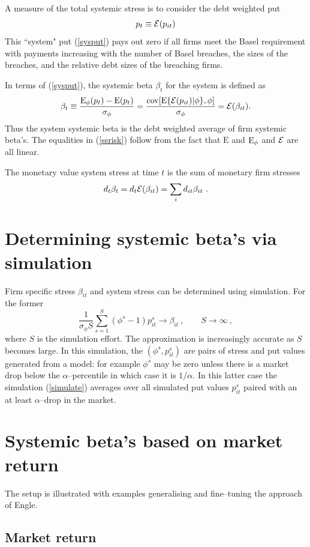 \documentclass[authoryear]{elsarticle}
\newcommand{\E}{\mathrm{E}}
\newcommand{\cov}{\mathrm{cov}}
\newcommand{\Ex}{{\cal E}}
\newcommand{\eref}[1]{(\ref{#1})}
\newcommand{\cq}{\ , \qquad}
\newcommand{\be}[1]{\begin{equation}\label{#1}}
\newcommand{\ee}{\end{equation}}
\begin{document}
A measure of the total systemic stress is to consider the debt weighted put 
\be{sysput}
p_t\equiv\Ex(p_{it})
\ee
This ``system" put \eref{sysput} pays out zero if all firms meet the Basel requirement with payments increasing with the number of Basel breaches, the sizes of the breaches, and the relative debt sizes of the breaching firms.  

In terms of \eref{sysput}, the  systemic beta $\beta_t$ for the system is defined as
\be{ssrisk}
 \beta_t\equiv\frac{\Es(p_{t}) -\E(p_{t})}{\sigma_\phi} = \frac{\cov[\E\{\Ex(p_{it})|\phi\},\phi]}{\sigma_\phi}=\Ex(\beta_{it}) .
\ee
Thus the system systemic beta is the debt weighted average of firm systemic beta's.  The equalities in \eref{ssrisk} follow from the fact that  $\E$ and $\Es$ and $\Ex$ are all linear.

The monetary value  system stress at time $t$ is the sum of monetary firm stresses
$$
d_t\beta_t = d_t\Ex(\beta_{it}) = \sum_i d_{it}\beta_{it}\ . 
$$


\section{Determining systemic beta's via simulation}

Firm specific stress $\beta_{it}$ and system stress  can be determined using simulation.   For the former
\be{simulate}
\frac{1}{\sigma_\phi S}\sum_{s=1}^S (\phi^s-1)p_{it}^s\rightarrow \beta_{it} \cq S\rightarrow\infty\ ,
\ee
where $S$ is the simulation effort.  The approximation is increasingly accurate as $S$ becomes large.  In this simulation, the $(\phi^s,p_{it}^s)$ are pairs of stress and put values generated from a model: for example $\phi^s$ may be zero unless there is a market drop below the $\alpha$--percentile in which case it is $1/\alpha$.   In this latter case the simulation \eref{simulate} averages over all simulated put values $p_{it}^s$ paired with an at least $\alpha$--drop in the market.





\section{Systemic beta's based on  market return}
The setup is illustrated with  examples generalising and fine--tuning the approach of Engle.

\subsection{Market return}
\end{document}

